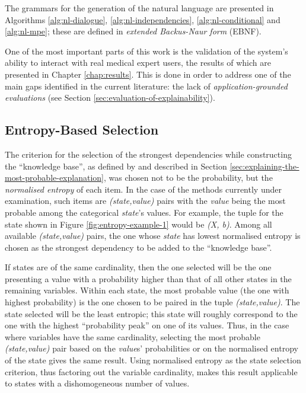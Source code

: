The grammars for the generation of the natural language are presented in Algorithms \ref{alg:nl-dialogue}, \ref{alg:nl-independencies}, \ref{alg:nl-conditional} and \ref{alg:nl-mpe}; these are defined in \textit{extended Backus-Naur form} (EBNF).

One of the most important parts of this work is the validation of the system's ability to interact with real medical expert users, the results of which are presented in Chapter \ref{chap:results}.
This is done in order to address one of the main gaps identified in the current literature: the lack of \textit{application-grounded evaluations} (see Section \ref{sec:evaluation-of-explainability}).

\subsection{Entropy-Based Selection} \label{subsec:entropy-based-selection}
The criterion for the selection of the strongest dependencies while constructing the \enquote{knowledge base}, as defined by \citet{Butz2018} and described in Section \ref{sec:explaining-the-most-probable-explanation}, was chosen not to be the probability, but the \textit{normalised entropy} of each item.
In the case of the methods currently under examination, such items are \textit{(state,value)} pairs with the \textit{value} being the most probable among the categorical \textit{state}'s values.
For example, the tuple for the state shown in Figure \ref{fig:entropy-example-1} would be \textit{(X, b)}.
Among all available \textit{(state,value)} pairs, the one whose \textit{state} has lowest normalised entropy is chosen as the strongest dependency to be added to the \enquote{knowledge base}.

If states are of the same cardinality, then the one selected will be the one presenting a value with a probability higher than that of all other states in the remaining variables.
Within each state, the most probable value (the one with highest probability) is the one chosen to be paired in the tuple \textit{(state,value)}.
The state selected will be the least entropic; this state will roughly correspond to the one with the highest \enquote{probability peak} on one of its values.
Thus, in the case where variables have the same cardinality, selecting the most probable \textit{(state,value)} pair based on the \textit{value}s' probabilities or on the normalised entropy of the state gives the same result.
Using normalised entropy as the state selection criterion, thus factoring out the variable cardinality, makes this result applicable to states with a dishomogeneous number of values.

